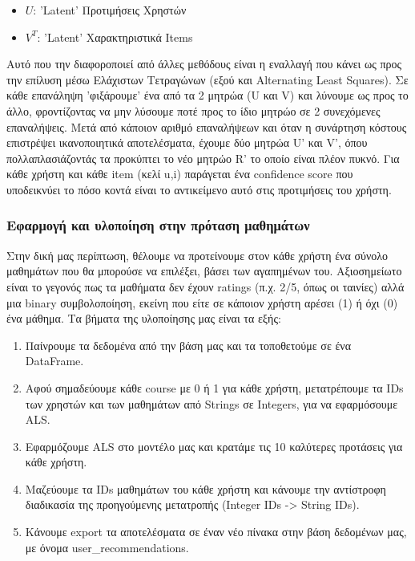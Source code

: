 \documentclass[a4paper,12pt]{article}
\begin{document}
\begin{itemize}
    \item $U$: 'Latent' Προτιμήσεις Χρηστών
    \item $V^T$: 'Latent' Χαρακτηριστικά Items
\end{itemize}

Αυτό που την διαφοροποιεί από άλλες μεθόδους είναι η εναλλαγή που κάνει ως προς την επίλυση μέσω Ελάχιστων Τετραγώνων (εξού και Alternating Least Squares). Σε κάθε επανάληψη 'φιξάρουμε' ένα από τα 2 μητρώα (U και V) και λύνουμε ως προς το άλλο, φροντίζοντας να μην λύσουμε ποτέ προς το ίδιο μητρώο σε 2 συνεχόμενες επαναλήψεις. Μετά από κάποιον αριθμό επαναλήψεων και όταν η συνάρτηση κόστους επιστρέψει ικανοποιητικά αποτελέσματα, έχουμε δύο μητρώα U' και V', όπου πολλαπλασιάζοντάς τα προκύπτει το νέο μητρώο R' το οποίο είναι πλέον πυκνό. Για κάθε χρήστη και κάθε item (κελί u,i) παράγεται ένα confidence score που υποδεικνύει το πόσο κοντά είναι το αντικείμενο αυτό στις προτιμήσεις του χρήστη.

\subsubsection{Εφαρμογή και υλοποίηση στην πρόταση μαθημάτων}
Στην δική μας περίπτωση, θέλουμε να προτείνουμε στον κάθε χρήστη ένα σύνολο μαθημάτων που θα μπορούσε να επιλέξει, βάσει των αγαπημένων του. Αξιοσημείωτο είναι το γεγονός πως τα μαθήματα δεν έχουν ratings (π.χ. 2/5, όπως οι ταινίες) αλλά μια binary συμβολοποίηση, εκείνη που είτε σε κάποιον χρήστη αρέσει (1) ή όχι (0) ένα μάθημα. Τα βήματα της υλοποίησης μας είναι τα εξής:

\begin{enumerate}
    \item Παίνρουμε τα δεδομένα από την βάση μας και τα τοποθετούμε σε ένα DataFrame.
    \item Αφού σημαδεύουμε κάθε course με 0 ή 1 για κάθε χρήστη, μετατρέπουμε τα IDs των χρηστών και των μαθημάτων από Strings σε Integers, για να εφαρμόσουμε ALS.
    \item Εφαρμόζουμε ALS στο μοντέλο μας και κρατάμε τις 10 καλύτερες προτάσεις για κάθε χρήστη.
    \item Μαζεύουμε τα IDs μαθημάτων του κάθε χρήστη και κάνουμε την αντίστροφη διαδικασία της προηγούμενης μετατροπής (Integer IDs -> String IDs). 
    \item Κάνουμε export τα αποτελέσματα σε έναν νέο πίνακα στην βάση δεδομένων μας, με όνομα user\_recommendations.
\end{enumerate}
\end{document}

